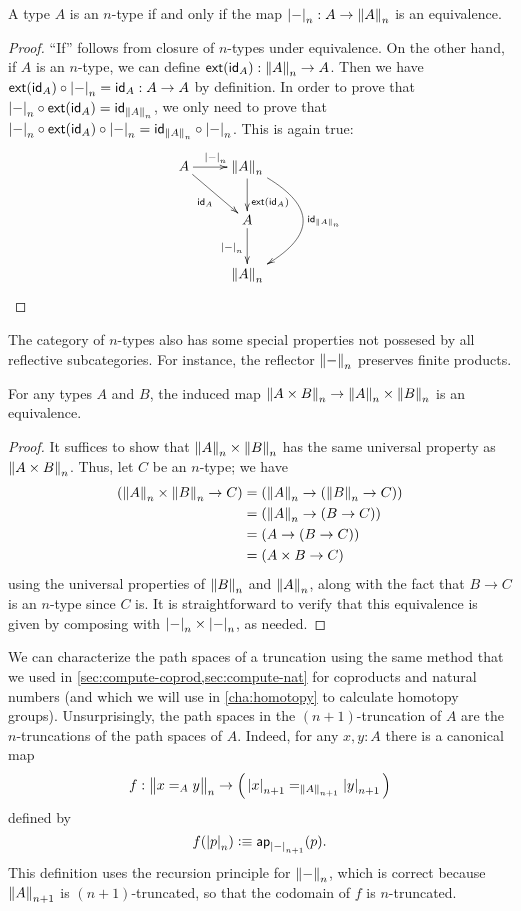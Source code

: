 \begin{cor}
  A type $A$ is an $n$-type if and only if the map $\tproj n- : A \to \trunc n A$ is an equivalence.
\end{cor}
\begin{proof}
  ``If'' follows from closure of $n$-types under equivalence.
  On the other hand, if $A$ is an $n$-type, we can define $\ext(\idfunc[A]):\trunc n A\to{}A$.
  Then we have $\ext(\idfunc[A])\circ\tproj n-=\idfunc[A]:A\to{}A$ by
  definition.  In order to prove that
  $\tproj n-\circ\ext(\idfunc[A])=\idfunc[\trunc nA]$, we only need to prove
  that $\tproj n-\circ\ext(\idfunc[A])\circ\tproj n-=
  \idfunc[\trunc nA]\circ\tproj n-$.
  This is again true:
  \[\xymatrix{
    A \ar^{\tproj n-}[r] \ar_{\idfunc[A]}[rd] &
    \trunc nA \ar^>>>{\ext(\idfunc[A])}[d] \ar@/^40pt/^{\idfunc[\trunc nA]}[dd] \\
    & A \ar_{\tproj n-}[d] \\
    & \trunc nA}\]
\end{proof}

The category of $n$-types also has some special properties not possesed by all reflective subcategories.
For instance, the reflector $\trunc n-$ preserves finite products.

\begin{thm}\label{cor:trunc-prod}
  For any types $A$ and $B$, the induced map $\trunc n{A\times B} \to \trunc nA \times \trunc nB$ is an equivalence.
\end{thm}
\begin{proof}
  It suffices to show that $\trunc nA \times \trunc nB$ has the same universal property as $\trunc n{A\times B}$.
  Thus, let $C$ be an $n$-type; we have
  \begin{align*}
    (\trunc nA \times \trunc nB \to C)
    &= (\trunc nA \to (\trunc nB \to C))\\
    &= (\trunc nA \to (B \to C))\\
    &= (A \to (B \to C))\\
    &= (A \times B \to C)
  \end{align*}
  using the universal properties of $\trunc nB$ and $\trunc nA$, along with the fact that $B\to C$ is an $n$-type since $C$ is.
  It is straightforward to verify that this equivalence is given by composing with $\tproj n- \times \tproj n-$, as needed.
\end{proof}

We can characterize the path spaces of a truncation using the same method that we used in \autoref{sec:compute-coprod,sec:compute-nat} for
coproducts and natural numbers (and which we will use in \autoref{cha:homotopy} to calculate homotopy groups).
Unsurprisingly, the path spaces in the $(n+1)$-truncation of $A$ are the $n$-truncations of the path spaces of $A$.
Indeed, for any $x,y:A$ there is a canonical map
\begin{equation}
  f:\ttrunc n{x=_Ay}\to \Big(\tproj {n+1}x=_{\trunc{n+1}A}\tproj {n+1}y\Big)\label{eq:path-trunc-map}
\end{equation}
defined by
\[f(\tproj n{p})\defeq \apfunc{\tproj {n+1}-}(p). \]
This definition uses the recursion principle for $\trunc n-$, which is correct because $\trunc {n+1}A$ is $(n+1)$-truncated, so that the
codomain of $f$ is $n$-truncated.

